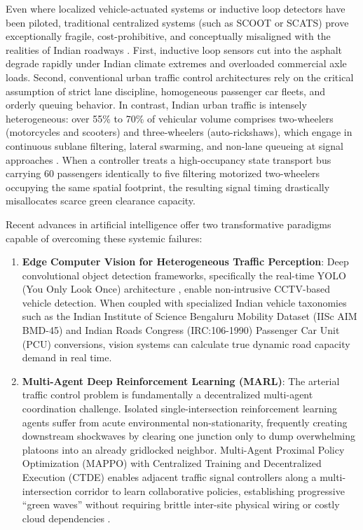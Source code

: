 Even where localized vehicle-actuated systems or inductive loop detectors have been piloted, traditional centralized systems (such as SCOOT or SCATS) prove exceptionally fragile, cost-prohibitive, and conceptually misaligned with the realities of Indian roadways \cite{ref_scats1980}. First, inductive loop sensors cut into the asphalt degrade rapidly under Indian climate extremes and overloaded commercial axle loads. Second, conventional urban traffic control architectures rely on the critical assumption of strict lane discipline, homogeneous passenger car fleets, and orderly queuing behavior. In contrast, Indian urban traffic is intensely heterogeneous: over 55\% to 70\% of vehicular volume comprises two-wheelers (motorcycles and scooters) and three-wheelers (auto-rickshaws), which engage in continuous sublane filtering, lateral swarming, and non-lane queueing at signal approaches \cite{ref_pune_dataset, ref_iisc_bmd45}. When a controller treats a high-occupancy state transport bus carrying 60 passengers identically to five filtering motorized two-wheelers occupying the same spatial footprint, the resulting signal timing drastically misallocates scarce green clearance capacity.

Recent advances in artificial intelligence offer two transformative paradigms capable of overcoming these systemic failures:
\begin{enumerate}
    \item \textbf{Edge Computer Vision for Heterogeneous Traffic Perception}: Deep convolutional object detection frameworks, specifically the real-time YOLO (You Only Look Once) architecture \cite{ref_yolov8}, enable non-intrusive CCTV-based vehicle detection. When coupled with specialized Indian vehicle taxonomies such as the Indian Institute of Science Bengaluru Mobility Dataset (IISc AIM BMD-45) and Indian Roads Congress (IRC:106-1990) Passenger Car Unit (PCU) conversions, vision systems can calculate true dynamic road capacity demand in real time.
    \item \textbf{Multi-Agent Deep Reinforcement Learning (MARL)}: The arterial traffic control problem is fundamentally a decentralized multi-agent coordination challenge. Isolated single-intersection reinforcement learning agents suffer from acute environmental non-stationarity, frequently creating downstream shockwaves by clearing one junction only to dump overwhelming platoons into an already gridlocked neighbor. Multi-Agent Proximal Policy Optimization (MAPPO) with Centralized Training and Decentralized Execution (CTDE) enables adjacent traffic signal controllers along a multi-intersection corridor to learn collaborative policies, establishing progressive ``green waves'' without requiring brittle inter-site physical wiring or costly cloud dependencies \cite{ref_mappo2022}.
\end{enumerate}

